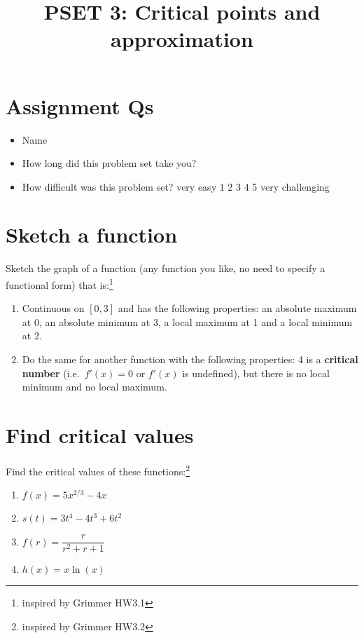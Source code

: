 \documentclass[
]{article}
\title{PSET 3: Critical points and approximation}
\author{}
\date{\vspace{-2.5em}}
\providecommand{\tightlist}{%
  \setlength{\itemsep}{0pt}\setlength{\parskip}{0pt}}
\begin{document}
\maketitle

\section{Assignment Qs}\label{assignment-qs}

\begin{itemize}
\item
  Name
\item
  How long did this problem set take you?
\item
  How difficult was this problem set? very easy 1 2 3 4 5 very
  challenging
\end{itemize}

\section{Sketch a function}\label{sketch-a-function}

Sketch the graph of a function (any function you like, no need to
specify a functional form) that is:\footnote{inspired by Grimmer HW3.1}

\begin{enumerate}
\def\labelenumi{\alph{enumi}.}
\tightlist
\item
  Continuous on \([0,3]\) and has the following properties: an absolute
  maximum at 0, an absolute minimum at 3, a local maximum at 1 and a
  local minimum at 2.
\item
  Do the same for another function with the following properties: 4 is a
  \textbf{critical number} (i.e.~\(f'(x) = 0\) or \(f'(x)\) is
  undefined), but there is no local minimum and no local maximum.
\end{enumerate}

\section{Find critical values}\label{find-critical-values}

Find the critical values of these functions:\footnote{inspired by
  Grimmer HW3.2}

\begin{enumerate}
\def\labelenumi{\alph{enumi}.}
\item
  \(f(x) = 5x^{2/3} - 4x\)
\item
  \(s(t) = 3t^4 - 4t^3 + 6t^2\)
\item
  \(f(r) = \dfrac{r}{r^2 +r + 1}\)
\item
  \(h(x) = x \ln(x)\)
\end{enumerate}
\end{document}
